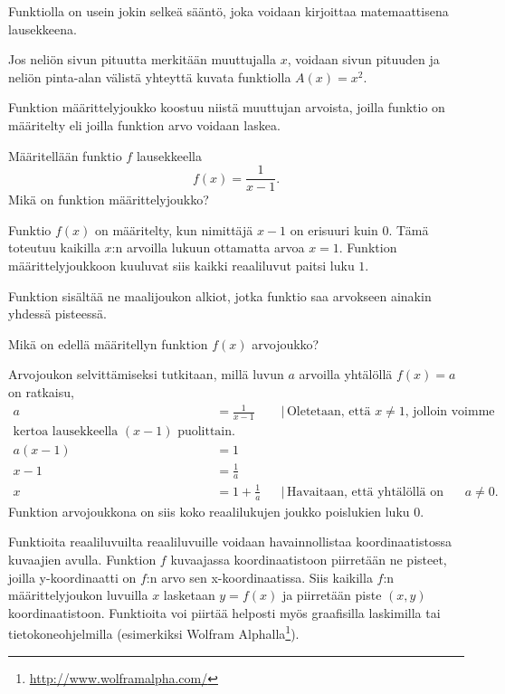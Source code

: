 Funktiolla on usein jokin selkeä sääntö, joka voidaan kirjoittaa matemaattisena lausekkeena.

\begin{esimerkki}
	Jos neliön sivun pituutta merkitään muuttujalla $x$, voidaan sivun pituuden
	ja neliön pinta-alan välistä yhteyttä kuvata funktiolla $A(x) = x^2$.
\end{esimerkki}

Funktion määrittelyjoukko koostuu niistä muuttujan arvoista, joilla
funktio on määritelty eli joilla funktion arvo voidaan laskea.

\begin{esimerkki}
	Määritellään funktio $f$ lausekkeella
	\[ f(x) = \frac{1}{x-1}. \]
	Mikä on funktion määrittelyjoukko?
	
	\begin{esimratk}
		Funktio $f(x)$ on määritelty, kun nimittäjä $x-1$ on erisuuri kuin 0.
		Tämä toteutuu kaikilla $x$:n arvoilla lukuun ottamatta arvoa $x = 1$.
		Funktion määrittelyjoukkoon kuuluvat siis kaikki reaaliluvut paitsi luku $1$.
	\end{esimratk}
\end{esimerkki}

Funktion  sisältää ne maalijoukon alkiot,
jotka funktio saa arvokseen ainakin yhdessä pisteessä.

\begin{esimerkki}
	Mikä on edellä määritellyn funktion $f(x)$ arvojoukko?
	\begin{esimratk}
		Arvojoukon selvittämiseksi tutkitaan, millä luvun $a$ arvoilla
		yhtälöllä $f(x) = a$ on ratkaisu,
		\begin{align*}
			a &= \frac{1}{x-1} & &| \, \text{Oletetaan, että $x \neq 1$, jolloin voimme} \\
			\text{kertoa lausekkeella $(x-1)$ puolittain.} \\
			a(x-1) &= 1 \\
			x-1 &= \frac{1}{a} \\
			x &= 1+\frac{1}{a} & &| \, \text{Havaitaan, että yhtälöllä on ratkaisu kaikilla $a \neq 0$.}
		\end{align*}
		Funktion arvojoukkona on siis koko reaalilukujen joukko poislukien luku $0$.
	\end{esimratk}
\end{esimerkki}

Funktioita reaaliluvuilta reaaliluvuille voidaan havainnollistaa koordinaatistossa kuvaajien avulla. Funktion $f$ kuvaajassa koordinaatistoon piirretään ne pisteet, joilla y-koordinaatti on $f$:n arvo sen x-koordinaatissa. Siis kaikilla $f$:n määrittelyjoukon luvuilla $x$ lasketaan $y = f(x)$ ja piirretään piste $(x, y)$ koordinaatistoon. Funktioita voi piirtää helposti myös graafisilla laskimilla tai tietokoneohjelmilla (esimerkiksi Wolfram Alphalla\footnote{\url{http://www.wolframalpha.com/}}).


